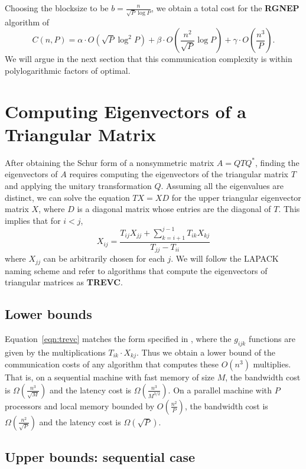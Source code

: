 \documentclass{article}
\def\lt{\left}
\def\rt{\right}
\newcommand{\dis}{\displaystyle}
\theoremstyle{definition}
\begin{document}
Choosing the blocksize to be $b=\frac{n}{\sqrt P \log P}$, we obtain a total cost for the {\bf RGNEP} algorithm of 
$$C(n,P) = \alpha \cdot O\lt( \sqrt P \log^2 P \rt) + \beta \cdot O\lt( \frac{n^2}{\sqrt P} \log P\rt) + \gamma \cdot O\lt( \frac{n^3}{P} \rt).$$
We will argue in the next section that this communication complexity is within polylogarithmic factors of optimal.


\section{Computing Eigenvectors of a Triangular Matrix} \label{cetm}

After obtaining the Schur form of a nonsymmetric matrix $A=QTQ^*$, finding the eigenvectors of $A$ requires computing the eigenvectors of the triangular matrix $T$ and applying the unitary transformation $Q$.  Assuming all the eigenvalues are distinct, we can solve the equation $TX=XD$ for the upper triangular eigenvector matrix $X$, where $D$ is a diagonal matrix whose entries are the diagonal of $T$.  This implies that for $i<j$,
\begin{equation}
\label{eqn:trevc}
X_{ij} = \frac{\dis T_{ij}X_{jj} + \sum_{k=i+1}^{j-1} T_{ik}X_{kj}}{T_{jj}-T_{ii}}
\end{equation}
where $X_{jj}$ can be arbitrarily chosen for each $j$.  We will follow the LAPACK naming scheme and refer to algorithms that compute the eigenvectors of triangular matrices as {\bf TREVC}.

\subsection{Lower bounds}

Equation~\ref{eqn:trevc} matches the form specified in \cite{BDHS10}, where the $g_{ijk}$ functions are given by the multiplications $T_{ik}\cdot X_{kj}$.  Thus we obtain a lower bound of the communication costs of any algorithm that computes these $O(n^3)$ multiplies.  That is, on a sequential machine with fast memory of size $M$, the bandwidth cost is
$\Omega\lt( \frac{n^3}{\sqrt M} \rt)$
and the latency cost is
$\Omega\lt( \frac{n^3}{M^{3/2}} \rt).$
On a parallel machine with $P$ processors and local memory bounded by $O\lt(\frac{n^2}{P}\rt)$, the bandwidth cost is
$\Omega\lt( \frac{n^2}{\sqrt P} \rt)$
and the latency cost is
$\Omega\lt( \sqrt P \rt).$

\subsection{Upper bounds: sequential case}
\end{document}
